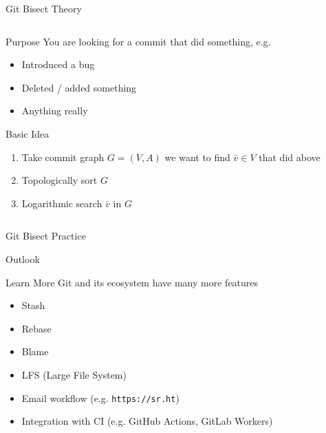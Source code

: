 \documentclass[xetex, handout]{beamer}
\begin{document}
\begin{frame}{Git Bisect Theory}
  \begin{columns}
    \begin{column}{.5\linewidth}
      \begin{block}{Purpose}
        You are looking for a commit that did something, e.g.
        \begin{itemize}
          \item Introduced a bug
          \item Deleted / added something
          \item Anything really
        \end{itemize}
      \end{block}
      \begin{alertblock}{Basic Idea}
        \begin{enumerate}
          \item Take commit graph $G = (V,A)$ we want to find $\bar{v} \in V$
            that did above
          \item Topologically sort $G$
          \item Logarithmic search $\bar{v}$ in $G$
        \end{enumerate}
      \end{alertblock}
    \end{column}
    \begin{column}{.5\linewidth}
    \end{column}
  \end{columns}
\end{frame}

\begin{frame}{Git Bisect Practice}
\end{frame}

\begin{frame}{Outlook}
  \begin{block}{Learn More}
    Git and its ecosystem have many more features
    \begin{itemize}
      \item Stash
      \item Rebase
      \item Blame
      \item LFS (Large File System)
      \item Email workflow (e.g. \texttt{https://sr.ht})
      \item Integration with CI (e.g. GitHub Actions, GitLab Workers)
    \end{itemize}
  \end{block}
\end{frame}
\end{document}
